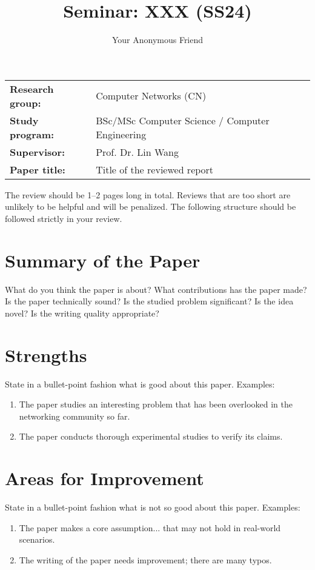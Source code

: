 \documentclass{../upb-cn}
\title{Seminar: XXX (SS24)}
\author{Your Anonymous Friend}
\begin{document}
\makethetitle

\begin{notebox}
    \begin{tabular}{@{}ll}
        \textbf{Research group:} & Computer Networks (CN) \\
        \textbf{Study program:} & BSc/MSc Computer Science / Computer Engineering \\
        \textbf{Supervisor:} & Prof. Dr. Lin Wang \\
        \textbf{Paper title:} & Title of the reviewed report
    \end{tabular}
\end{notebox}

The review should be 1--2 pages long in total. Reviews that are too short are unlikely to be helpful and will be penalized. The following structure should be followed strictly in your review.

\section{Summary of the Paper}

What do you think the paper is about? What contributions has the paper made? Is the paper technically sound? Is the studied problem significant? Is the idea novel? Is the writing quality appropriate?


\section{Strengths}

State in a bullet-point fashion what is good about this paper. Examples:

\begin{enumerate}
    \item The paper studies an interesting problem that has been overlooked in the networking community so far.
    \item The paper conducts thorough experimental studies to verify its claims. 
\end{enumerate}

\section{Areas for Improvement}

State in a bullet-point fashion what is not so good about this paper. Examples:

\begin{enumerate}
    \item The paper makes a core assumption... that may not hold in real-world scenarios.
    \item The writing of the paper needs improvement; there are many typos.
\end{enumerate}
\end{document}
